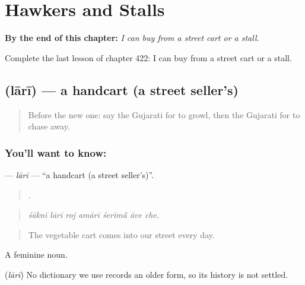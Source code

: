 
\chapter{Hawkers and Stalls}
\label{ch:gu-hawkers-and-stalls}

\begin{chapteropening}
\textbf{By the end of this chapter:} \emph{I can buy from a street cart or a stall.}

Complete the last lesson of chapter 422: I can buy from a street cart or a stall.
\end{chapteropening}

\section[\texorpdfstring{\gu{લારી} (lārī)}{લારી (lārī)}]{ (lārī) — a handcart (a street seller's)}

\label{lesson:GU-C422-lari}



\begin{quote}
Before the new one: say the Gujarati for to growl, then the Gujarati for to chase away.
\end{quote}

\subsection*{You'll want to know: }
\textbf{} — \emph{lārī} — \textquotedblleft{}a handcart (a street seller's)\textquotedblright{}.

\begin{quote}
      .
\end{quote}

\begin{quote}
\emph{śāknī lārī roj amārī śerīmā̃ āve che.}
\end{quote}

\begin{quote}
The vegetable cart comes into our street every day.
\end{quote}

A feminine noun.

\begin{cousinweb}
\textbf{} (\emph{lārī}) No dictionary we use records an older form, so its history is not settled.
\end{cousinweb}

